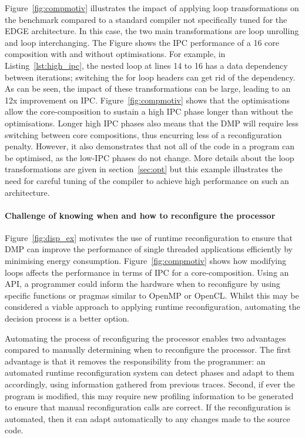 Figure~\ref{fig:compmotiv} illustrates the impact of applying loop transformations on the  benchmark compared to a standard compiler not specifically tuned for the EDGE architecture.
In this case, the two main transformations are loop unrolling and loop interchanging.
The Figure shows the IPC performance of a 16 core composition with and without optimisations.
For example, in Listing~\ref{lst:high_ipc}, the nested loop at lines 14 to 16 has a data dependency between iterations; switching the for loop headers can get rid of the dependency.
As can be seen, the impact of these transformations can be large, leading to an 12x improvement on IPC.
Figure~\ref{fig:compmotiv} shows that the optimisations allow the core-composition to sustain a high IPC phase longer than without the optimisations.
Longer high IPC phases also means that the DMP will require less switching between core compositions, thus encurring less of a reconfiguration penalty.
However, it also demonstrates that not all of the code in a program can be optimised, as the low-IPC phases do not change.
More details about the loop transformations are given in section~\ref{sec:opt} but this example illustrates the need for careful tuning of the compiler to achieve high performance on such an architecture.

\paragraph{Challenge of knowing when and how to reconfigure the processor}

Figure~\ref{fig:disp_ex} motivates the use of runtime reconfiguration to ensure that DMP can improve the performance of single threaded applications efficiently by minimising energy consumption.
Figure~\ref{fig:compmotiv} shows how modifying loops affects the performance in terms of IPC for a core-composition.
Using an API, a programmer could inform the hardware when to reconfigure by using specific functions or pragmas similar to OpenMP or OpenCL.
Whilst this may be considered a viable approach to applying runtime reconfiguration, automating the decision process is a better option.

Automating the process of reconfiguring the processor enables two advantages compared to manually determining when to reconfigure the processor.
The first advantage is that it removes the responsibility from the programmer: an automated runtime reconfiguration system can detect phases and adapt to them accordingly, using information gathered from previous traces.
Second, if ever the program is modified, this may require new profiling information to be generated to ensure that manual reconfiguration calls are correct.
If the reconfiguration is automated, then it can adapt automatically to any changes made to the source code.

